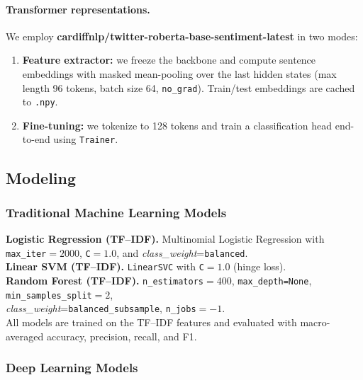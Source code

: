 \documentclass[10pt]{article}
\begin{document}
\paragraph{Transformer representations.}
We employ \textbf{cardiffnlp/twitter-roberta-base-sentiment-latest} in two modes:
\begin{enumerate}
  \item \textbf{Feature extractor:} we freeze the backbone and compute sentence embeddings with masked mean-pooling over the last hidden states (max length 96 tokens, batch size 64, \texttt{no\_grad}). Train/test embeddings are cached to \texttt{.npy}.
  \item \textbf{Fine-tuning:} we tokenize to 128 tokens and train a classification head end-to-end using \texttt{Trainer}.
\end{enumerate}

\subsection{Modeling}

\subsubsection{Traditional Machine Learning Models}
\textbf{Logistic Regression (TF--IDF).} Multinomial Logistic Regression with \texttt{max\_iter}$=2000$, \texttt{C}$=1.0$, and \textit{class\_weight}=\texttt{balanced}.\\
\textbf{Linear SVM (TF--IDF).} \texttt{LinearSVC} with \texttt{C}$=1.0$ (hinge loss).\\
\textbf{Random Forest (TF--IDF).} \texttt{n\_estimators}$=400$, \texttt{max\_depth=None}, \texttt{min\_samples\_split}$=2$,\\
\textit{class\_weight}=\texttt{balanced\_subsample}, \texttt{n\_jobs}$=-1$.\\
All models are trained on the TF--IDF features and evaluated with macro-averaged accuracy, precision, recall, and F1.

\subsubsection{Deep Learning Models}
\end{document}
